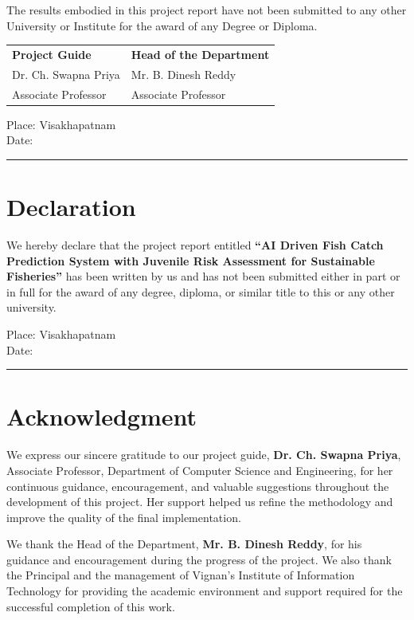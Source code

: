 \documentclass[12pt,a4paper]{report}
\begin{document}
The results embodied in this project report have not been submitted to any other University or Institute for the award of any Degree or Diploma.

\vspace{2cm}
\noindent
\begin{tabular}{p{} p{}}
\textbf{Project Guide} & \textbf{Head of the Department} \\
Dr. Ch. Swapna Priya & Mr. B. Dinesh Reddy \\
Associate Professor & Associate Professor \\
\end{tabular}

\vspace{1.5cm}
\noindent Place: Visakhapatnam\\
Date: \rule{4cm}{0.4pt}

\chapter*{Declaration}
We hereby declare that the project report entitled \textbf{``AI Driven Fish Catch Prediction System with Juvenile Risk Assessment for Sustainable Fisheries''} has been written by us and has not been submitted either in part or in full for the award of any degree, diploma, or similar title to this or any other university.

\vspace{1.2cm}
\noindent Place: Visakhapatnam\\
Date: \rule{4cm}{0.4pt}

\chapter*{Acknowledgment}
We express our sincere gratitude to our project guide, \textbf{Dr. Ch. Swapna Priya}, Associate Professor, Department of Computer Science and Engineering, for her continuous guidance, encouragement, and valuable suggestions throughout the development of this project. Her support helped us refine the methodology and improve the quality of the final implementation.

We thank the Head of the Department, \textbf{Mr. B. Dinesh Reddy}, for his guidance and encouragement during the progress of the project. We also thank the Principal and the management of Vignan's Institute of Information Technology for providing the academic environment and support required for the successful completion of this work.
\end{document}

